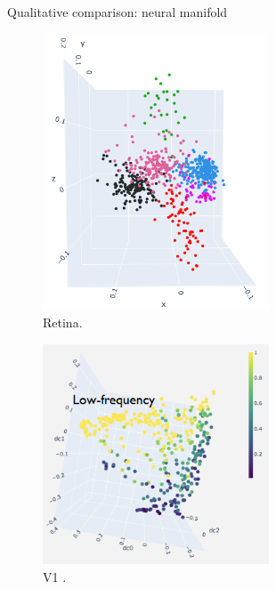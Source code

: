 \documentclass[xcolor={dvipsnames,svgnames}]{beamer}
\begin{document}
\begin{frame}{Qualitative comparison: neural manifold}
        \begin{minipage}[b]{.45\linewidth}  
    \begin{figure}
            \includegraphics[width=0.6\textwidth]{figures/biological/retina-manifold.png}
            \caption{Retina.}
        \end{figure} 
    \end{minipage}
      \begin{minipage}[b]{.45\linewidth}   
      \begin{figure}         \includegraphics[width=0.6\textwidth]{figures/biological/v1-manifold-luciano.PNG}
      \caption{V1 \cite{dyballa_manifold_2021}.}
            \end{figure} 
    \end{minipage}
    

\end{frame}
\end{document}
